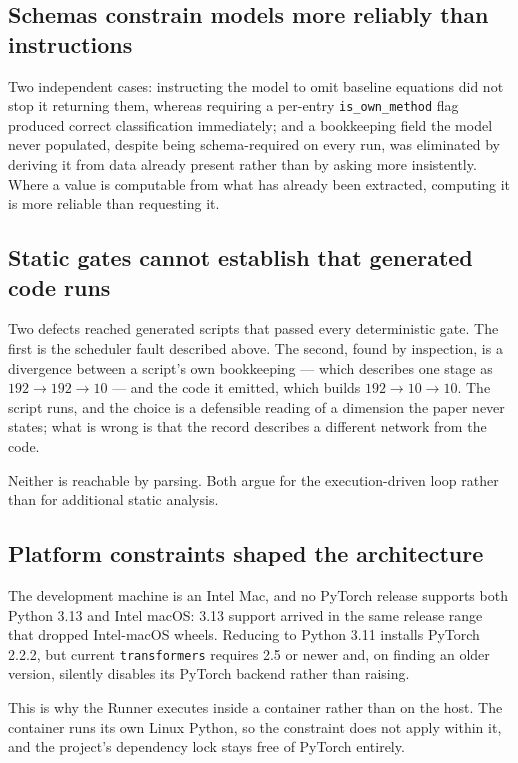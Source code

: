 \documentclass[11pt]{article}
\begin{document}
\subsection{Schemas constrain models more reliably than instructions}

Two independent cases: instructing the model to omit baseline equations did not stop it
returning them, whereas requiring a per-entry \texttt{is\_own\_method} flag produced
correct classification immediately; and a bookkeeping field the model never populated,
despite being schema-required on every run, was eliminated by deriving it from data
already present rather than by asking more insistently. Where a value is computable from
what has already been extracted, computing it is more reliable than requesting it.

\subsection{Static gates cannot establish that generated code runs}

Two defects reached generated scripts that passed every deterministic gate. The first is
the scheduler fault described above. The second, found by inspection, is a divergence
between a script's own bookkeeping --- which describes one stage as $192\to192\to10$ ---
and the code it emitted, which builds $192\to10\to10$. The script runs, and the choice is
a defensible reading of a dimension the paper never states; what is wrong is that the
record describes a different network from the code.

Neither is reachable by parsing. Both argue for the execution-driven loop rather than for
additional static analysis.

\subsection{Platform constraints shaped the architecture}

The development machine is an Intel Mac, and no PyTorch release supports both Python 3.13
and Intel macOS: 3.13 support arrived in the same release range that dropped Intel-macOS
wheels. Reducing to Python 3.11 installs PyTorch 2.2.2, but current \texttt{transformers}
requires 2.5 or newer and, on finding an older version, silently disables its PyTorch
backend rather than raising.

This is why the Runner executes inside a container rather than on the host. The container
runs its own Linux Python, so the constraint does not apply within it, and the project's
dependency lock stays free of PyTorch entirely.
\end{document}
